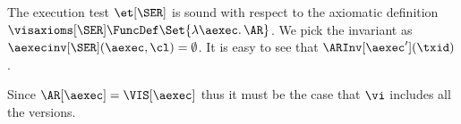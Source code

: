 The execution test $\et[\SER]$ is sound with respect to the axiomatic definition 
\( \visaxioms[\SER] \FuncDef \Set{\lambda \aexec \ldotp \AR } \).
We pick the invariant as \( \aexecinv[\SER]( \aexec, \cl ) = \emptyset \).
It is easy to see that \( \ARInv[\aexec'] (\txid) \).

\COMPLETELET{\SER}
Since \( \AR[\aexec] = \VIS[\aexec]\) thus it must be the case that \( \vi \) includes all the versions.
